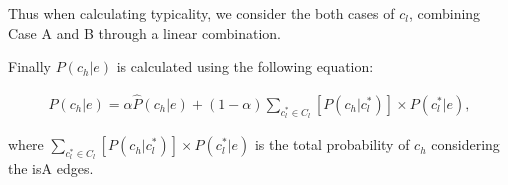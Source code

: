 %
Thus when calculating typicality, we consider the both cases of $c_l$, combining Case A and B through a linear combination.

Finally  $P({c_h}|e)$ is calculated using the following equation:

\begin{equation}
\begin{split}
P({c_h}|e) = \alpha \hat{P}({c_h}|e)+ (1-\alpha) \sum_{ c_{l}^*\in C_{l} } [P({c_h}|c_{l}^*) ] \times  P(c_{l}^*|e),
\end{split}
\label{eq:pgge}\end{equation}

where $\sum_{ c_{l}^*\in C_{l} } [P({c_h}|c_{l}^*) ] \times  P(c_{l}^*|e)$ is the total probability of $c_h$ considering the isA edges.


%
%

